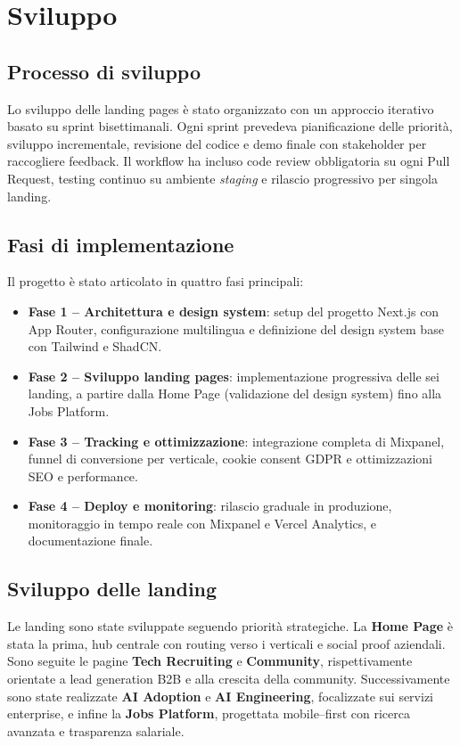 \chapter{Sviluppo}

\section{Processo di sviluppo}
Lo sviluppo delle landing pages è stato organizzato con un approccio
iterativo basato su sprint bisettimanali. Ogni sprint prevedeva
pianificazione delle priorità, sviluppo incrementale, revisione del
codice e demo finale con stakeholder per raccogliere feedback.  
Il workflow ha incluso code review obbligatoria su ogni Pull Request,
testing continuo su ambiente \textit{staging} e rilascio progressivo
per singola landing.

\section{Fasi di implementazione}
Il progetto è stato articolato in quattro fasi principali:


\begin{itemize}
  \item \textbf{Fase 1 – Architettura e design system}: setup del progetto
  Next.js con App Router, configurazione multilingua e definizione del design
  system base con Tailwind e ShadCN.
  \item \textbf{Fase 2 – Sviluppo landing pages}: implementazione progressiva
  delle sei landing, a partire dalla Home Page (validazione del design system) fino alla Jobs Platform.
  \item \textbf{Fase 3 – Tracking e ottimizzazione}: integrazione completa di
  Mixpanel, funnel di conversione per verticale, cookie consent GDPR e
  ottimizzazioni SEO e performance.
  \item \textbf{Fase 4 – Deploy e monitoring}: rilascio graduale in produzione,
  monitoraggio in tempo reale con Mixpanel e Vercel Analytics, e documentazione finale.
\end{itemize}

\section{Sviluppo delle landing}
Le landing sono state sviluppate seguendo priorità strategiche. La
\textbf{Home Page} è stata la prima, hub centrale con routing verso i verticali
e social proof aziendali.  
Sono seguite le pagine \textbf{Tech Recruiting} e \textbf{Community}, rispettivamente orientate a lead generation B2B e alla crescita della community.  
Successivamente sono state realizzate \textbf{AI Adoption} e \textbf{AI Engineering}, focalizzate sui servizi enterprise, e infine la \textbf{Jobs Platform}, progettata mobile–first con ricerca avanzata e trasparenza salariale.  

